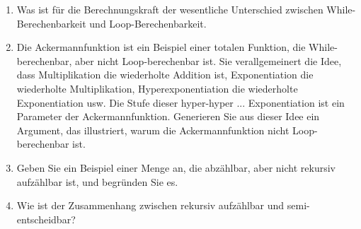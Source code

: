 \documentclass{lehramt-informatik-aufgabe}
\begin{document}
\begin{enumerate}
\item Was ist für die Berechnungskraft der wesentliche Unterschied
zwischen While-Berechenbarkeit und Loop-Berechenbarkeit.


\item Die Ackermannfunktion ist ein Beispiel einer totalen Funktion, die
While-berechenbar, aber nicht Loop-berechenbar ist. Sie verallgemeinert
die Idee, dass Multiplikation die wiederholte Addition ist,
Exponentiation die wiederholte Multiplikation, Hyperexponentiation die
wiederholte Exponentiation usw. Die Stufe dieser hyper-hyper ...
Exponentiation ist ein Parameter der Ackermannfunktion. Generieren Sie
aus dieser Idee ein Argument, das illustriert, warum die
Ackermannfunktion nicht Loop-berechenbar ist.


\item Geben Sie ein Beispiel einer Menge an, die abzählbar, aber nicht
rekursiv aufzählbar ist, und begründen Sie es.


\item Wie ist der Zusammenhang zwischen rekursiv aufzählbar und
semi-entscheidbar?

\end{enumerate}
\end{document}
